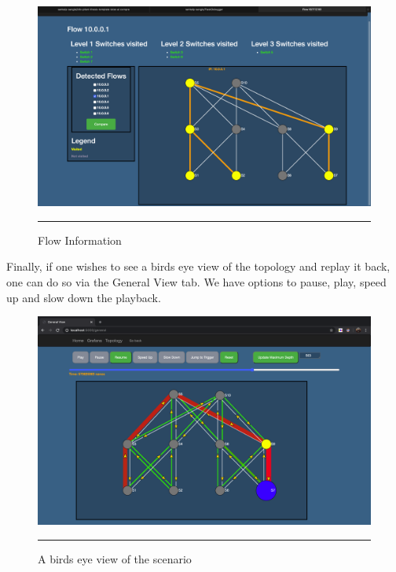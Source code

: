 \begin{figure}[htbp]
	\centering
		\includegraphics[width=1.0\columnwidth]{Figures/flow.png}
		\rule{35em}{0.5pt}
	\caption[Flow Information]{Flow Information}
	\label{fig:flow}
\end{figure}

Finally, if one wishes to see a birds eye view of the topology and replay it back, one can
do so via the General View tab. We have options to pause, play, speed up and slow down the playback.

\begin{figure}[htbp]
	\centering
		\includegraphics[width=1.0\columnwidth]{Figures/genview.png}
		\rule{35em}{0.5pt}
	\caption[Birds eye view]{A birds eye view of the scenario}
	\label{fig:birdseye}
\end{figure}